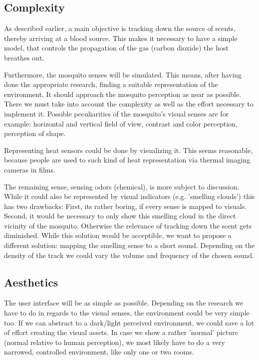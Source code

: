 \documentclass{acm_proc_article-sp}
\begin{document}
\subsection{Complexity}
As described earlier, a main objective is tracking down the source of scents, thereby arriving at a blood source. This makes it necessary to have a simple model, that controls the propagation of the gas (carbon dioxide) the host breathes out.

Furthermore, the mosquito senses will be simulated. This means, after having done the appropriate research, finding a suitable representation of the environment. It should approach the mosquito perception as near as possible. There we must take into account the complexity as well as the effort necessary to implement it. Possible peculiarities of the mosquito's visual senses are for example: horizontal and vertical field of view, contrast and color perception, perception of shape. 

Representing heat sensors could be done by visualizing it. This seems reasonable, because people are used to such kind of heat representation via thermal imaging cameras in films.

The remaining sense, sensing odors (chemical), is more subject to discussion. While it could also be represented by visual indicators (e.g. 'smelling clouds') this has two drawbacks: First, its rather boring, if every sense is mapped to visuals. Second, it would be necessary to only show this smelling cloud in the direct vicinity of the mosquito. Otherwise the relevance of tracking down the scent gets diminished. While this solution would be acceptible, we want to propose a different solution: mapping the smelling sense to a short sound. Depending on the density of the track we could vary the volume and frequency of the chosen sound. 

\subsection{Aesthetics}
The user interface will be as simple as possible. Depending on the research we have to do in regards to the visual senses, the environment could be very simple too. If we can abstract to a dark/light perceived environment, we could save a lot of effort creating the visual assets. In case we show a rather 'normal' picture (normal relative to human perception), we most likely have to do a very narrowed, controlled environment, like only one or two rooms.
\end{document}
